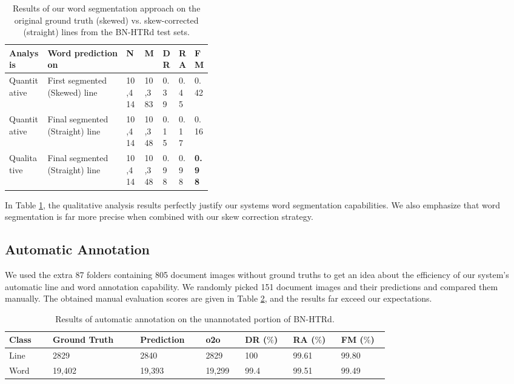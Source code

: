 \documentclass[runningheads]{llncs}
\begin{document}
\begin{table}[h]
\vspace{-4mm}
\centering
\caption{Results of our word segmentation approach on the original ground truth (skewed) vs. skew-corrected (straight) lines from the BN-HTRd test sets.}\label{drishti-tab6}
\begin{tabular}
{|l|l|p{0.09\linewidth}|p{0.09\linewidth}|p{0.07\linewidth}|p{0.07\linewidth}|p{0.07\linewidth}|}
\hline
\textbf{Analysis} & \textbf{Word prediction on} & \textbf{N} & \textbf{M} & \textbf{DR} & \textbf{RA} & \textbf{FM} \\ \hline
Quantitative & First segmented (Skewed) line & 10,414 & 10,383 & 0.39 & 0.45 & 0.42 \\
\hline
Quantitative & Final segmented (Straight) line & 10,414 & 10,348 & 0.15 & 0.17 & 0.16 \\ 
\hline
Qualitative & Final segmented (Straight) line & 10,414 & 10,348 & 0.98 & 0.98 & \textbf{0.98 }\\ 
\hline
\end{tabular}
\vspace{-4mm}
\end{table}

\noindent In Table \ref{drishti-tab6}, the qualitative analysis results perfectly justify our systems word segmentation capabilities. We also emphasize that word segmentation is far more precise when combined with our skew correction strategy.

\subsection{Automatic Annotation}
We used the extra 87 folders containing 805 document images without ground truths to get an idea about the efficiency of our system's automatic line and word annotation capability. We randomly picked 151 document images and their predictions and compared them manually. The obtained manual evaluation scores are given in Table \ref{drishti-tab7}, and the results far exceed our expectations.

\begin{table}[h]
\vspace{-4mm}
\centering
\caption{Results of automatic annotation on the unannotated portion of BN-HTRd.}\label{drishti-tab7}
\vspace{-1mm}
\begin{tabular}{|p{0.1\linewidth}|p{0.20\linewidth}|p{0.15\linewidth}|p{0.09\linewidth}|p{0.11\linewidth}|p{0.11\linewidth}|p{0.11\linewidth}|}
\hline
\textbf{Class} & \textbf{Ground Truth} & \textbf{Prediction} & \textbf{o2o} & \textbf{DR ($\%$)} & \textbf{RA ($\%$)} & \textbf{FM ($\%$)}\\
\hline
Line &	2829 &	2840 &	2829 &	100 &	99.61 &	99.80\\
\hline
Word &	19,402 &	19,393  &	19,299 &	99.4 &	99.51 &	99.49\\
\hline
\end{tabular}
\vspace{-6mm}
\end{table}
\end{document}
